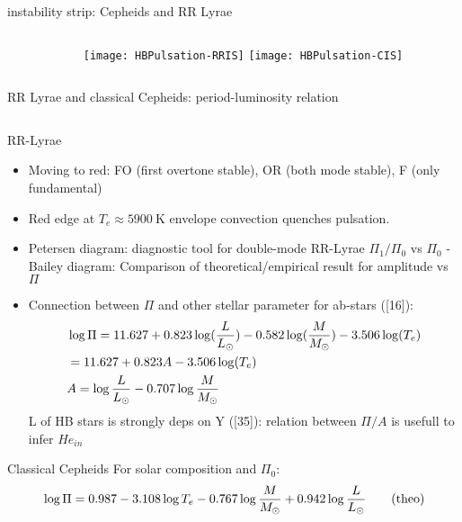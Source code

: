 \begin{frame}{instability strip: Cepheids and RR Lyrae}
\begin{columns}[T]
\begin{column}{0.65\textwidth}
    \end{column}
	\begin{column}{0.35\textwidth}
	\begin{figure}[!ht] 
	\texttt{[image: HBPulsation-RRIS]}\label{fig:HBPulsation-RRIS}
	\texttt{[image: HBPulsation-CIS]}\label{fig:HBPulsation-CIS}
	\end{figure}
\end{column}\end{columns}
\end{frame}

\begin{frame}{RR Lyrae and classical Cepheids: period-luminosity relation}
\begin{columns}[T]
	\begin{column}{0.7\textwidth}
        \begin{block}{RR-Lyrae}
        \begin{itemize}
            \item Moving to red: FO (first overtone stable), OR (both mode stable), F (only fundamental)
            \item Red edge at $T_e\approx\SI{5900}{\kelvin}$ envelope convection quenches pulsation.
	\item Petersen diagram: diagnostic tool for double-mode RR-Lyrae $\Pi_1/\Pi_0$ vs $\Pi_0$ - Bailey diagram: Comparison of theoretical/empirical result for amplitude vs $\Pi$
\item  Connection between $\Pi$ and other stellar parameter for ab-stars ([16]):
\begin{align*}
&\log{\Pi}=11.627+0.823\log(\frac{L}{L_{\odot}})-0.582\log(\frac{M}{M_{\odot}})-3.506\log(T_e)\\
&=11.627+0.823A-3.506\log(T_e)\\
&A=\log{\frac{L}{L_{\odot}{}}}-0.707\log{\frac{M}{M_{\odot}{}}}
\end{align*}
L of HB stars is strongly deps on Y ([35]): relation between $\Pi/A$ is usefull to infer $He_{in}$
        \end{itemize}     
        \end{block}
        \begin{block}{Classical Cepheids}
For solar composition and $\Pi_0$:
\begin{align*}
&\log{\Pi}=0.987-3.108\log{T_e}-0.767\log{\frac{M}{\msun}}+0.942\log{\frac{L}{\lsun}}\tag{theo}\\

\end{align*}
\end{block}
\end{column}
\end{columns}
\end{frame}
